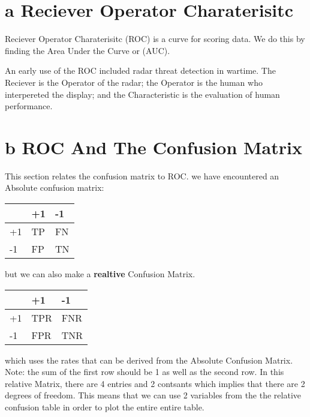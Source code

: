 \documentclass[12pt]{book}
\title{\coursetitle\linebreak\lecturename}
\author{\\Cain Susko\\ 
           \\ \\ \\
      Queen's University 
    \\School of Computing\\}
\begin{document}
\begin{titlepage}
        \maketitle
\end{titlepage}


\section*{a Reciever Operator Charaterisitc}
Reciever Operator Charaterisitc (ROC) is a curve for scoring data. We do this by finding the 
Area Under the Curve or (AUC).

An early use of the ROC included radar threat detection in wartime. The Reciever is the Operator
of the radar; the Operator is the human who interpereted the display; and the Characteristic is
the evaluation of human performance.


\section*{b ROC And The Confusion Matrix}
This section relates the confusion matrix to ROC.
we have encountered an Absolute confusion matrix:
\begin{table}[h]
        \centering
\begin{tabular}{@{}lll@{}}
\toprule
                        & +1 & -1 \\ \midrule
\multicolumn{1}{l|}{+1} & TP & FN  \\
\multicolumn{1}{l|}{-1} & FP & TN   \\ \bottomrule
\end{tabular}
\end{table}

but we can also make a \textbf{realtive} Confusion Matrix.
\begin{table}[h]
        \centering
\begin{tabular}{@{}lll@{}}
\toprule
                        & +1 & -1  \\ \midrule
\multicolumn{1}{l|}{+1} &TPR & FNR \\
\multicolumn{1}{l|}{-1} &FPR & TNR \\ \bottomrule
\end{tabular}
\end{table}

which uses the rates that can be derived from the Absolute Confusion Matrix. Note: the sum of the
first row should be 1 as well as the second row. In this relative Matrix, there are 4 entries
and 2 contsants which implies that there are 2 degrees of freedom. This means that we can 
use 2 variables from the the relative confusion table in order to plot the entire entire table.
\end{document}
